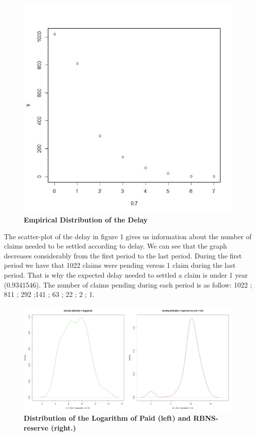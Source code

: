 \documentclass[a4paper]{article}
\begin{document}
\begin{figure}[h]
  \centering
  \includegraphics[scale=0.3]{delay.jpg}
  \caption{\textbf{Empirical Distribution of the Delay}}
\end{figure}

\newpage

The scatter-plot of the delay in figure 1 gives us information about the number of claims needed to be settled according to delay. We can see that the graph decreases considerably from the first period to the last period. During the first period we have that 1022 claims were pending versus 1 claim during the last period. That is why the expected delay needed to settled a claim is under 1 year (0.9341546). The number of claims pending during each period is as follow:   1022 ; 811 ; 292 ;141 ; 63  ; 22  ;  2  ;  1.


\begin{figure}[h]
  \centering
  \includegraphics[scale=0.2]{paid_par_reserve.png}
  \caption{\textbf{Distribution of the Logarithm of Paid (left) and RBNS-reserve (right.)}}
\end{figure}
\end{document}
